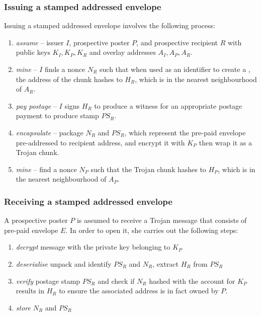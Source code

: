 \subsubsection{Issuing a stamped addressed envelope}

Issuing a stamped addressed envelope involves the following process:

\begin{enumerate}[noitemsep]
\item \emph{assume} -- issuer $I$, prospective poster $P$, and prospective recipient $R$ with public keys $K_I, K_P, K_R$ and overlay addresses $A_I, A_P, A_R$.
\item \emph{mine} -- $I$ finds a nonce $N_R$ such that when used as an identifier to create a , the  address of the chunk hashes to $H_R$, which is in the nearest neighbourhood of $A_R$.
\item \emph{pay postage} -- $I$ signs $H_R$ to produce a witness for an appropriate postage payment to produce stamp $PS_R$.
\item \emph{encapsulate} -- package $N_R$ and $PS_R$, which represent the pre-paid envelope pre-addressed to recipient address, and encrypt it with $K_P$ then wrap it as a Trojan chunk.
\item \emph{mine} -- find a nonce $N_P$ such that the Trojan chunk hashes to $H_P$, which is in the nearest neighbourhood of $A_P$. 
\end{enumerate}




\subsubsection{Receiving a stamped addressed envelope}

A prospective poster $P$ is assumed to receive a Trojan message that consists of pre-paid envelope $E$. In order to open it, she carries out the following steps:

\begin{enumerate}[noitemsep]
    \item \emph{decrypt} message with the private key belonging to $K_P$
    \item \emph{deserialise} unpack and identify $PS_R$ and $N_R$, extract $H_R$ from $PS_R$
    \item \emph{verify} postage stamp $PS_R$ and check if $N_R$ hashed with the account for $K_P$ results in $H_R$ to ensure the associated address is in fact owned by $P$.
    \item \emph{store} $N_R$ and $PS_R$ 
\end{enumerate}

